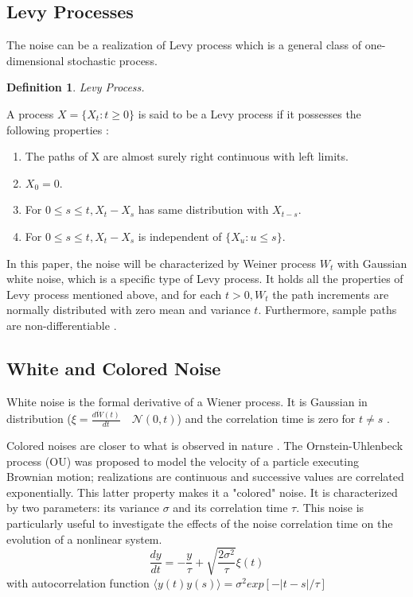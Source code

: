 \documentclass[a4paper, 11pt]{article}
\newtheorem{definition}{Definition}
\begin{document}
\subsection{Levy Processes}
The noise can be a realization of Levy process which is a general class of one-dimensional stochastic process.

\begin{definition}
	Levy Process.
\end{definition}
A process $X = \lbrace X_t: t \geq 0 \rbrace$ is said to be a Levy process if it possesses the following properties \cite{bib:levy}:
\begin{enumerate}
	\item The paths of X are almost surely right continuous with left limits.
	\item $X_0 = 0$.
	\item For $0 \leq s \leq t, X_t - X_s$ has same distribution with $X_{t-s}$.
	\item For $0 \leq s \leq t, X_t - X_s$ is independent of $\lbrace X_u : u \leq s \rbrace$.
\end{enumerate}

In this paper, the noise will be characterized by Weiner process $W_t$ with Gaussian white noise, which is a specific type of Levy process. It holds all the properties of Levy process mentioned above, and for each $t > 0, W_t$ the path increments are normally distributed with zero mean and variance $t$. Furthermore, sample paths are non-differentiable \cite{bib:tut}.

\subsection{White and Colored Noise}
White noise is the formal derivative of a Wiener process. It is Gaussian in distribution ($\xi = \frac{d \dot{W}(t)}{dt} \quad \mathcal{N}(0, t)$) and the correlation time is zero for $t \neq s$ \cite{bib:sch}.

Colored noises are closer to what is observed in nature \cite{bib:app}. The Ornstein-Uhlenbeck process (OU) was proposed to model the velocity of a particle executing Brownian motion; realizations are continuous and successive values are correlated exponentially. This latter property makes it a "colored" noise. It is characterized by two parameters: its variance $\sigma$ and its correlation time $\tau$. This noise is particularly useful to investigate the effects of the noise correlation time on the evolution of a nonlinear system.
\begin{equation*}
\frac{dy}{dt} = -\frac{y}{\tau} + \sqrt{\frac{2 \sigma^2}{\tau}}\xi(t)
\end{equation*}
with autocorrelation function $\langle y(t) y(s) \rangle = \sigma^2 exp\left[-|t-s|/\tau\right]$
\end{document}
